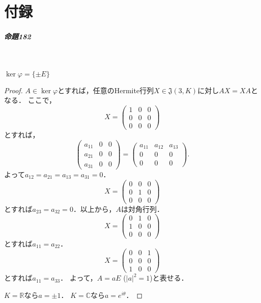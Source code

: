 \documentclass[a4paper, leqno]{ltjsreport}
\begin{document}
\chapter*{付録}
\paragraph{命題182}~
\begin{screen}
  \(\ker\varphi = \{\pm E\}\)
\end{screen}
\begin{proof}
  \(A \in \ker\varphi\)とすれば，任意のHermite行列\(X \in \mathfrak{J}(3, K)\)に対し\(AX = XA\)となる．
  ここで，
  \[
  X =
  \begin{pmatrix}
    1 & 0 & 0 \\
    0 & 0 & 0 \\
    0 & 0 & 0
  \end{pmatrix}
  \]
  とすれば，
  \[
  \begin{pmatrix}
    a_{11} & 0 & 0 \\
    a_{21} & 0 & 0 \\
    a_{31} & 0 & 0
  \end{pmatrix}
  =
  \begin{pmatrix}
    a_{11} & a_{12} & a_{13} \\
    0 & 0 & 0 \\
    0 & 0 & 0
  \end{pmatrix}
  .
  \]
  よって\(a_{12} = a_{21} = a_{13} = a_{31} = 0\)．
  \[
  X =
  \begin{pmatrix}
    0 & 0 & 0 \\
    0 & 1 & 0 \\
    0 & 0 & 0
  \end{pmatrix}
  \]
  とすれば\(a_{23} = a_{32} = 0\)．以上から，\(A\)は対角行列．
  \[
  X =
  \begin{pmatrix}
    0 & 1 & 0 \\
    1 & 0 & 0 \\
    0 & 0 & 0
  \end{pmatrix}
  \]
  とすれば\(a_{11} = a_{22}\)．
  \[
  X =
  \begin{pmatrix}
    0 & 0 & 1 \\
    0 & 0 & 0 \\
    1 & 0 & 0
  \end{pmatrix}
  \]
  とすれば\(a_{11} = a_{33}\)．
  よって，\(A = a E\) (\(\lvert a\rvert^2 = 1\))と表せる．

  \(K = \mathbb{R}\)なら\(a=\pm 1\)．
  \(K = \mathbb{C}\)なら\(a=e^{i\theta}\)．


\end{proof}
\end{document}
